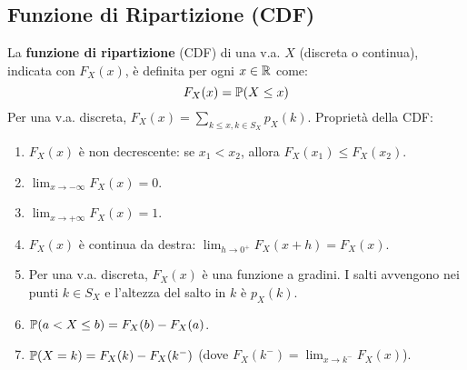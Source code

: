 \documentclass[12pt,a4paper]{article}
\begin{document}
\begin{example}
\section{Funzione di Ripartizione (CDF)}
\begin{definition}
La \textbf{funzione di ripartizione} (CDF) di una v.a. $X$ (discreta o continua), indicata con $F_X(x)$, è definita per ogni $x \in \mathbb{R}$ come:
\[ F_X(x) = \mathbb{P}(X \le x) \]
Per una v.a. discreta, $F_X(x) = \sum_{k \le x, k \in S_X} p_X(k)$.
Proprietà della CDF:
\begin{enumerate}
    \item $F_X(x)$ è non decrescente: se $x_1 < x_2$, allora $F_X(x_1) \le F_X(x_2)$.
    \item $\lim_{x \to -\infty} F_X(x) = 0$.
    \item $\lim_{x \to +\infty} F_X(x) = 1$.
    \item $F_X(x)$ è continua da destra: $\lim_{h \to 0^+} F_X(x+h) = F_X(x)$.
    \item Per una v.a. discreta, $F_X(x)$ è una funzione a gradini. I salti avvengono nei punti $k \in S_X$ e l'altezza del salto in $k$ è $p_X(k)$.
    \item $\mathbb{P}(a < X \le b) = F_X(b) - F_X(a)$.
    \item $\mathbb{P}(X=k) = F_X(k) - F_X(k^-)$ (dove $F_X(k^-) = \lim_{x \to k^-} F_X(x)$).
\end{enumerate}
\end{definition}


\end{example}
\end{document}
